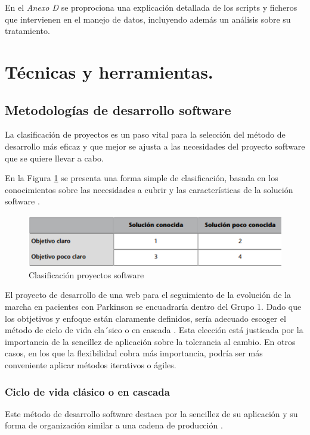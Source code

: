 En el \textit{Anexo D} se proprociona una explicación detallada de los scripts y ficheros que intervienen en el manejo de datos, incluyendo además un análisis sobre su tratamiento.

 
\section{Técnicas y herramientas.}


\subsection{Metodologías de desarrollo software}
La clasificación de proyectos es un paso vital para la selección del método de desarrollo más eficaz y que mejor se ajusta a las necesidades del proyecto software que se quiere llevar a cabo.

En la Figura \ref{fig:clasificacionProyectos} se presenta una forma simple de clasificación, basada en los conocimientos sobre las necesidades a cubrir y las características de la solución software \cite{pradel2013ingenieria}.

\begin{figure}[h]
    \centering
    \includegraphics[width=1\textwidth]{img/4.TecnicasHerramientas/Clasificacion.png}
    \caption{Clasificación proyectos software \cite{pradel2013ingenieria}}
    \label{fig:clasificacionProyectos}
\end{figure}

El proyecto de desarrollo de una web para el seguimiento de la evolución de la marcha en pacientes con Parkinson se encuadraría dentro del Grupo 1. Dado que los obtjetivos y enfoque están claramente definidos, sería adecuado escoger el método de ciclo de vida cla´sico o en cascada \cite{pradel2013ingenieria}. Esta elección está justicada por la importancia de la sencillez de aplicación sobre la tolerancia al cambio. En otros casos, en los que la flexibilidad cobra más importancia, podría ser más conveniente aplicar métodos iterativos o ágiles.

\subsubsection{Ciclo de vida clásico o en cascada}
Este método de desarrollo software destaca por la sencillez de su aplicación y su forma de organización similar a una cadena de producción \cite{pradel2013ingenieria}.

